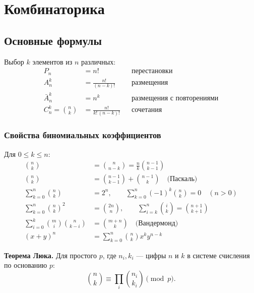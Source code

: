 \chapter{Комбинаторика}

\section{Основные формулы}
Выбор $k$ элементов из $n$ различных:
\begin{align*}
	P_n &= n! && \text{перестановки}\\
	A_n^k &= \frac{n!}{(n-k)!} && \text{размещения}\\
	\bar A_n^k &= n^k && \text{размещения с повторениями}\\
	C_n^k = \binom{n}{k} &= \frac{n!}{k!\,(n-k)!} && \text{сочетания}
\end{align*}

\subsection{Свойства биномиальных коэффициентов}
Для $0 \le k \le n$:
\begin{align*}
	\binom{n}{k} &= \binom{n}{n-k} = \frac{n}{k}\binom{n-1}{k-1}\\
	\binom{n}{k} &= \binom{n-1}{k-1} + \binom{n-1}{k} \quad \text{(Паскаль)}\\
	\sum_{k=0}^{n} \binom{n}{k} &= 2^n, \qquad \sum_{k=0}^{n} (-1)^k \binom{n}{k} = 0 \quad (n > 0)\\
	\sum_{k=0}^{n} \binom{n}{k}^2 &= \binom{2n}{n}, \qquad \sum_{i=k}^{n} \binom{i}{k} = \binom{n+1}{k+1}\\
	\sum_{i=0}^{k} \binom{m}{i}\binom{n}{k-i} &= \binom{m+n}{k} \quad \text{(Вандермонд)}\\
	(x + y)^n &= \sum_{k=0}^{n} \binom{n}{k} x^k y^{n-k}
\end{align*}

\textbf{Теорема Люка.} Для простого $p$, где $n_i, k_i$ --- цифры $n$ и $k$ в системе счисления по основанию $p$:
\[ \binom{n}{k} \equiv \prod_i \binom{n_i}{k_i} \pmod p. \]

